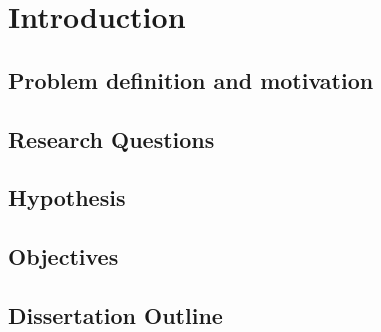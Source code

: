 
\chapter{Introduction} %

\label{Chapter:1}

\section{Problem definition and motivation}


\section{Research Questions}



\section{Hypothesis}



\section{Objectives}



\section{Dissertation Outline}


